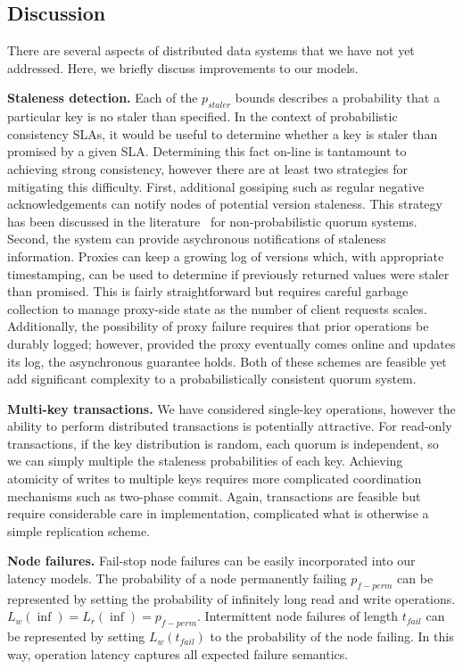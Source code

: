 \documentclass{vldb}
\begin{document}
\subsection{Discussion}
\label{sec:discussion}

There are several aspects of distributed data systems that we have not yet
addressed.  Here, we briefly discuss improvements to our models.

\textbf{Staleness detection.} Each of the $p_{staler}$ bounds
describes a probability that a particular key is no staler than
specified.  In the context of probabilistic consistency SLAs, it would
be useful to determine whether a key is staler than promised by a
given SLA.  Determining this fact on-line is tantamount to achieving
strong consistency, however there are at least two strategies for
mitigating this difficulty. First, additional gossiping such as
regular negative acknowledgements can notify nodes of potential
version staleness.  This strategy has been discussed in the
literature~\cite{tocite} for non-probabilistic quorum systems.
Second, the system can provide asychronous notifications of staleness
information.  Proxies can keep a growing log of versions which, with
appropriate timestamping, can be used to determine if previously
returned values were staler than promised.  This is fairly
straightforward but requires careful garbage collection to manage
proxy-side state as the number of client requests scales.
Additionally, the possibility of proxy failure requires that prior
operations be durably logged; however, provided the proxy eventually
comes online and updates its log, the asynchronous guarantee holds.
Both of these schemes are feasible yet add significant complexity to a
probabilistically consistent quorum system.

\textbf{Multi-key transactions.} We have considered single-key operations,
however the ability to perform distributed transactions is potentially
attractive.  For read-only transactions, if the key distribution is
random, each quorum is independent, so we can simply multiple the
staleness probabilities of each key.  Achieving atomicity of writes to
multiple keys requires more complicated coordination mechanisms such
as two-phase commit.  Again, transactions are feasible but require
considerable care in implementation, complicated what is otherwise a
simple replication scheme.

\textbf{Node failures.} Fail-stop node failures can be easily
incorporated into our latency models. The probability of a node
permanently failing $p_{f-perm}$ can be represented by setting the
probability of infinitely long read and write
operations. $L_{w}(\inf)=L_{r}(\inf)=p_{f-perm}$.  Intermittent node
failures of length $t_{fail}$ can be represented by setting
$L_{w}(t_{fail})$ to the probability of the node failing.  In this
way, operation latency captures all expected failure semantics.
\end{document}
